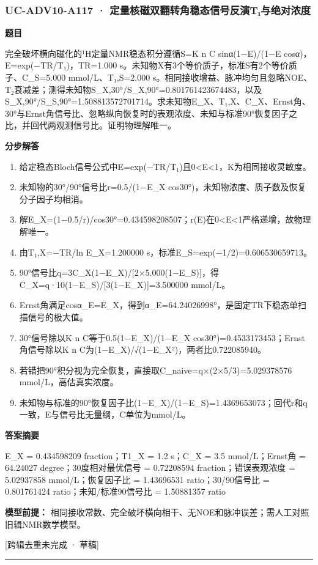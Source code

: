\documentclass[UTF8,11pt,a4paper]{ctexart}
\begin{document}
\subsubsection*{UC-ADV10-A117 · 定量核磁双翻转角稳态信号反演T₁与绝对浓度}
\noindent\textbf{题目}\par
完全破坏横向磁化的¹H定量NMR稳态积分遵循S=K n C sinα(1−E)/(1−E cosα)，E=exp(−TR/T₁)，TR=1.000 s。未知物X有3个等价质子，标准S有2个等价质子、C\_S=5.000 mmol/L、T₁,S=2.000 s。相同接收增益、脉冲均匀且忽略NOE、T₂衰减差；测得未知物S\_X,30°/S\_X,90°=0.801761423674483，以及S\_X,90°/S\_S,90°=1.508813572701714。求未知物E\_X、T₁,X、C\_X、Ernst角、30°与Ernst角信号比、忽略纵向恢复时的表观浓度、未知与标准90°恢复因子之比，并回代两观测信号比。证明物理解唯一。\par
\medskip\noindent\textbf{分步解答}
\begin{enumerate}
\item 给定稳态Bloch信号公式中E=exp(−TR/T₁)且0<E<1，K为相同接收灵敏度。
\item 未知物的30°/90°信号比r=0.5/(1−E\_X cos30°)，未知物浓度、质子数及恢复分子因子均相消。
\item 解E\_X=(1−0.5/r)/cos30°=0.434598208507；r(E)在0<E<1严格递增，故物理解唯一。
\item 由T₁,X=−TR/ln E\_X=1.200000 s，标准E\_S=exp(−1/2)=0.606530659713。
\item 90°信号比q=3C\_X(1−E\_X)/[2×5.000(1−E\_S)]，得C\_X=q·10(1−E\_S)/[3(1−E\_X)]=3.500000 mmol/L。
\item Ernst角满足cosα\_E=E\_X，得到α\_E=64.24026998°，是固定TR下稳态单扫描信号的极大值。
\item 30°信号除以K n C等于0.5(1−E\_X)/(1−E\_X cos30°)=0.4533173453；Ernst角信号除以K n C为(1−E\_X)/√(1−E\_X²)，两者比0.722085940。
\item 若错把90°积分视为完全恢复，直接取C\_naive=q×(2×5/3)=5.029378576 mmol/L，高估真实浓度。
\item 未知物与标准的90°恢复因子比(1−E\_X)/(1−E\_S)=1.4369653073；回代r和q一致，E与信号比无量纲，C单位为mmol/L。
\end{enumerate}
\noindent\textbf{答案摘要}\par
E\_X = 0.434598209 fraction；T1\_X = 1.2 s；C\_X = 3.5 mmol/L；Ernst角 = 64.24027 degree；30度相对最优信号 = 0.72208594 fraction；错误表观浓度 = 5.02937858 mmol/L；恢复因子比 = 1.43696531 ratio；30/90信号比 = 0.801761424 ratio；未知/标准90信号比 = 1.50881357 ratio\par
\noindent\textbf{模型前提：}
相同接收常数、完全破坏横向相干、无NOE和脉冲误差；需人工对照旧辑NMR数学模型。\par
\noindent\textcolor{red!65!black}{[跨辑去重未完成 · 草稿]} \par
\medskip\hrule\medskip
{}
\end{document}
